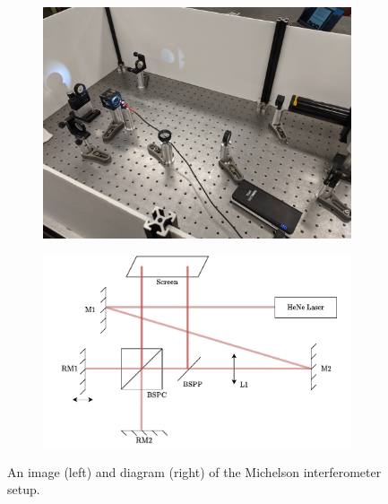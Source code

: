 \documentclass[notitlepage]{report}
\begin{document}
	\begin{figure}[p]
		\centering
		\begin{subfigure}[b]{0.5\textwidth}
			\includegraphics[width=\linewidth]{PXL_20210205_010019887}
		\end{subfigure}
		\hfill
		\begin{subfigure}[b]{0.45\textwidth}
			\includegraphics[width=\linewidth]{lab1diagram}
		\end{subfigure}
		\caption{An image (left) and diagram (right) of the Michelson interferometer setup.}
		\label{fig:lab1diagram}
	\end{figure}
	
\end{document}
